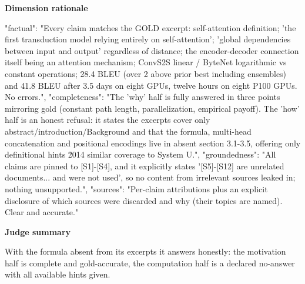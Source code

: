 \documentclass[10pt]{article}
\begin{document}
\textbf{Dimension rationale}
\begin{EvidenceText}
{
  "factual": "Every claim matches the GOLD excerpt: self-attention definition; 'the first transduction model relying entirely on self-attention'; 'global dependencies between input and output' regardless of distance; the encoder-decoder connection itself being an attention mechanism; ConvS2S linear / ByteNet logarithmic vs constant operations; 28.4 BLEU (over 2 above prior best including ensembles) and 41.8 BLEU after 3.5 days on eight GPUs, twelve hours on eight P100 GPUs. No errors.",
  "completeness": "The 'why' half is fully answered in three points mirroring gold (constant path length, parallelization, empirical payoff). The 'how' half is an honest refusal: it states the excerpts cover only abstract/introduction/Background and that the formula, multi-head concatenation and positional encodings live in absent section 3.1-3.5, offering only definitional hints \u2014 similar coverage to System U.",
  "groundedness": "All claims are pinned to [S1]-[S4], and it explicitly states '[S5]-[S12] are unrelated documents... and were not used', so no content from irrelevant sources leaked in; nothing unsupported.",
  "sources": "Per-claim attributions plus an explicit disclosure of which sources were discarded and why (their topics are named). Clear and accurate."
}
\end{EvidenceText}

\textbf{Judge summary}
\begin{EvidenceText}
With the formula absent from its excerpts it answers honestly: the motivation half is complete and gold-accurate, the computation half is a declared no-answer with all available hints given.
\end{EvidenceText}
\end{document}

